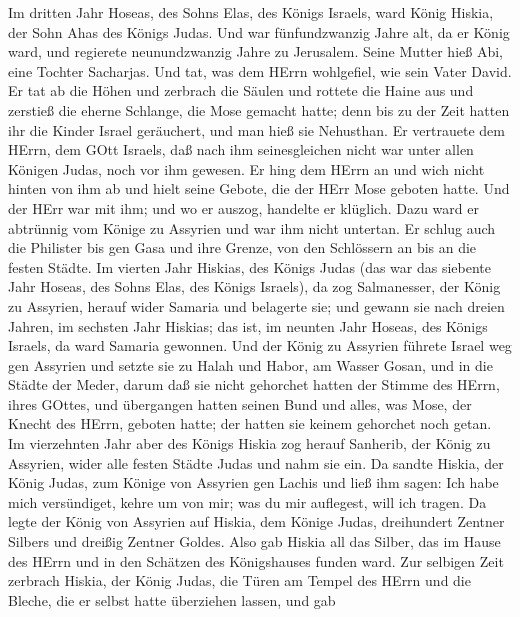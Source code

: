  Im dritten Jahr Hoseas, des Sohns Elas, des Königs Israels,
ward König Hiskia, der Sohn Ahas des Königs Judas.  Und war
fünfundzwanzig Jahre alt, da er König ward, und regierete neunundzwanzig
Jahre zu Jerusalem. Seine Mutter hieß Abi, eine Tochter Sacharjas.
 Und tat, was dem HErrn wohlgefiel, wie sein Vater David.
 Er tat ab die Höhen und zerbrach die Säulen und rottete die
Haine aus und zerstieß die eherne Schlange, die Mose gemacht hatte; denn
bis zu der Zeit hatten ihr die Kinder Israel geräuchert, und man hieß
sie Nehusthan.  Er vertrauete dem HErrn, dem GOtt Israels,
daß nach ihm seinesgleichen nicht war unter allen Königen Judas, noch
vor ihm gewesen.  Er hing dem HErrn an und wich nicht hinten
von ihm ab und hielt seine Gebote, die der HErr Mose geboten hatte.
 Und der HErr war mit ihm; und wo er auszog, handelte er
klüglich. Dazu ward er abtrünnig vom Könige zu Assyrien und war ihm
nicht untertan.  Er schlug auch die Philister bis gen Gasa
und ihre Grenze, von den Schlössern an bis an die festen Städte.
 Im vierten Jahr Hiskias, des Königs Judas (das war das
siebente Jahr Hoseas, des Sohns Elas, des Königs Israels), da zog
Salmanesser, der König zu Assyrien, herauf wider Samaria und belagerte
sie;  und gewann sie nach dreien Jahren, im sechsten Jahr
Hiskias; das ist, im neunten Jahr Hoseas, des Königs Israels, da ward
Samaria gewonnen.  Und der König zu Assyrien führete Israel
weg gen Assyrien und setzte sie zu Halah und Habor, am Wasser Gosan, und
in die Städte der Meder,  darum daß sie nicht gehorchet
hatten der Stimme des HErrn, ihres GOttes, und übergangen hatten seinen
Bund und alles, was Mose, der Knecht des HErrn, geboten hatte; der
hatten sie keinem gehorchet noch getan.  Im vierzehnten
Jahr aber des Königs Hiskia zog herauf Sanherib, der König zu Assyrien,
wider alle festen Städte Judas und nahm sie ein.  Da sandte
Hiskia, der König Judas, zum Könige von Assyrien gen Lachis und ließ ihm
sagen: Ich habe mich versündiget, kehre um von mir; was du mir
auflegest, will ich tragen. Da legte der König von Assyrien auf Hiskia,
dem Könige Judas, dreihundert Zentner Silbers und dreißig Zentner
Goldes.  Also gab Hiskia all das Silber, das im Hause des
HErrn und in den Schätzen des Königshauses funden ward. 
Zur selbigen Zeit zerbrach Hiskia, der König Judas, die Türen am Tempel
des HErrn und die Bleche, die er selbst hatte überziehen lassen, und gab

